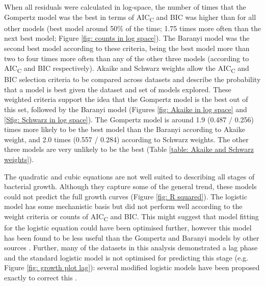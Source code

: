 \documentclass[11pt]{article}
\begin{document}
\begin{linenumbers}
        When all residuals were calculated in log-space, the number of times that the Gompertz model was the best in terms of AIC\textsubscript{C} and BIC was higher than for all other models (best model around 50\% of the time; 1.75 times more often than the next best model; Figure \ref{fig: counts in log space}). The Baranyi model was the second best model according to these criteria, being the best model more than two to four times more often than any of the other three models (according to AIC\textsubscript{C} and BIC respectively). Akaike and Schwarz weights allow the AIC\textsubscript{C} and BIC selection criteria to be compared across datasets and describe the probability that a model is best given the dataset and set of models explored. These weighted criteria support the idea that the Gompertz model is the best out of this set, followed by the Baranyi model (Figures \ref{fig: Akaike in log space} and \ref{Sfig: Schwarz in log space}). The Gompertz model is around 1.9 (0.487 / 0.256) times more likely to be the best model than the Baranyi according to Akaike weight, and 2.0 times (0.557 / 0.284) according to Schwarz weights. The other three models are very unlikely to be the best (Table \ref{table: Akaike and Schwarz weights}).
        
        The quadratic and cubic equations are not well suited to describing all stages of bacterial growth. Although they capture some of the general trend, these models could not predict the full growth curves (Figure \ref{fig: R squared}). The logistic model has some mechanistic basis but did not perform well according to the weight criteria or counts of AIC\textsubscript{C} and BIC. This might suggest that model fitting for the logistic equation could have been optimised further, however this model has been found to be less useful than the Gompertz and Baranyi models by other sources \citep{peleg_modeling_1997, mckellar_primary_2003}. Further, many of the datasets in this analysis demonstrated a lag phase and the standard logistic model is not optimised for predicting this stage (e.g. Figure \ref{fig: growth plot lag}): several modified logistic models have been proposed exactly to correct this \citep[e.g.][]{fujikawa_new_2004}. 


\end{linenumbers}
\end{document}
